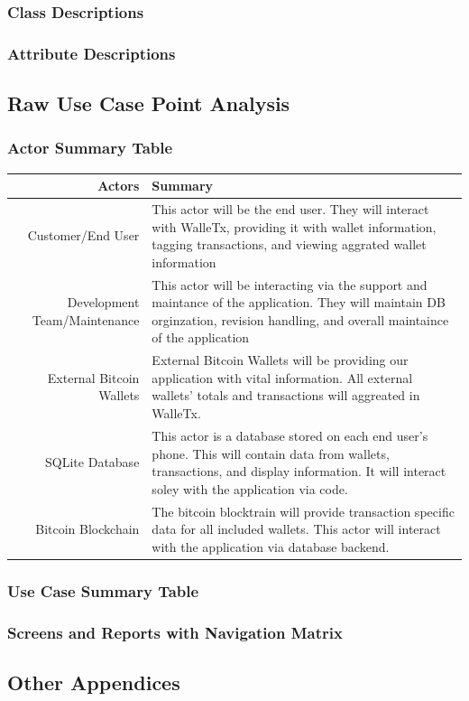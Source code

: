 	
    \subsubsection{Class Descriptions}
      \begin{figure}[H]
      \end{figure}

    \subsubsection{Attribute Descriptions}
  \subsection{Raw Use Case Point Analysis}
    \subsubsection{Actor Summary Table}
    \begin{table}[H]
      \begin{tabularx}{\textwidth}{r | X}
        Actors                       & Summary\\
        \hline
        Customer/End User            & This actor will be the end user.  They will interact with WalleTx,  providing it with wallet information, tagging transactions, and viewing  aggrated wallet information\\
        Development Team/Maintenance & This actor will be interacting via the support and maintance of the  application.  They will maintain DB orginzation, revision handling, and  overall maintaince of the application\\
        External Bitcoin Wallets     & External Bitcoin Wallets will be providing our application with vital  information.  All external wallets' totals and transactions will  aggreated in WalleTx.\\
        SQLite Database              & This actor is a database stored on each end user's phone. This will  contain data from wallets, transactions, and display information.  It  will interact soley with the application via code.\\
        Bitcoin Blockchain           & The bitcoin blocktrain will provide transaction specific data for all  included wallets. This actor will interact with the application via  database backend.\\
      \end{tabularx}
    \end{table}

    \subsubsection{Use Case Summary Table}

    \subsubsection{Screens and Reports with Navigation Matrix}
  \subsection{Other Appendices}
